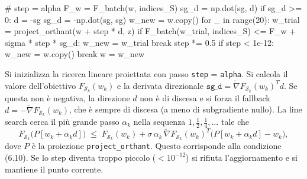 \documentclass[a4paper,12pt]{article}
\begin{document}
\begin{pythoncode}[title= Newton-L1]

#
        step = alpha
        F_w = F_batch(w, indices_S)
        sg_d = np.dot(sg, d)
        if sg_d >= 0:
            d = -sg
            sg_d = -np.dot(sg, sg)
        w_new = w.copy()
        for _ in range(20):
            w_trial = project_orthant(w + step * d, z)
            if F_batch(w_trial, indices_S) <= F_w + sigma * step * sg_d:
                w_new = w_trial
                break
            step *= 0.5
            if step < 1e-12:
                w_new = w.copy()
                break
        w = w_new
\end{pythoncode}
Si inizializza la ricerca lineare proiettata con passo \texttt{step} = \texttt{alpha}. Si calcola il valore dell'obiettivo $F_{\mathcal{S}_k}(w_k)$ e la derivata direzionale $\texttt{sg\_d} = \widetilde{\nabla}F_{\mathcal{S}_k}(w_k)^T d$. Se questa non è negativa, la direzione $d$ non è di discesa e si forza il fallback $d = -\widetilde{\nabla}F_{\mathcal{S}_k}(w_k)$, che è sempre di discesa (a meno di subgradiente nullo). La line search cerca il più grande passo $\alpha_k$ nella sequenza $1,\frac12,\frac14,\dots$ tale che
\[
F_{\mathcal{S}_k}\bigl(P[w_k+\alpha_k d]\bigr) \;\le\; F_{\mathcal{S}_k}(w_k) + \sigma\,\alpha_k\,\widetilde{\nabla}F_{\mathcal{S}_k}(w_k)^T\bigl(P[w_k+\alpha_k d]-w_k\bigr),
\]
dove $P$ è la proiezione \texttt{project\_orthant}. Questo corrisponde alla condizione (6.10). Se lo step diventa troppo piccolo ($<10^{-12}$) si rifiuta l'aggiornamento e si mantiene il punto corrente.
\end{document}
